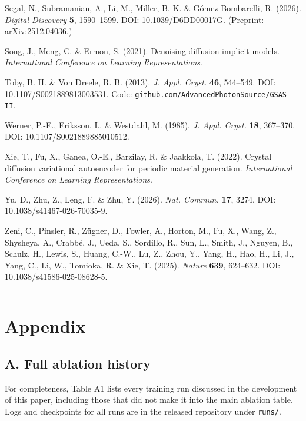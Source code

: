 \documentclass[
  11pt,
]{article}
\begin{document}
Segal, N., Subramanian, A., Li, M., Miller, B. K. \& Gómez-Bombarelli,
R. (2026). \emph{Digital Discovery} \textbf{5}, 1590--1599. DOI:
10.1039/D6DD00017G. (Preprint: arXiv:2512.04036.)

Song, J., Meng, C. \& Ermon, S. (2021). Denoising diffusion implicit
models. \emph{International Conference on Learning Representations}.

Toby, B. H. \& Von Dreele, R. B. (2013). \emph{J. Appl. Cryst.}
\textbf{46}, 544--549. DOI: 10.1107/S0021889813003531. Code:
\texttt{github.com/AdvancedPhotonSource/GSAS-II}.

Werner, P.-E., Eriksson, L. \& Westdahl, M. (1985). \emph{J. Appl.
Cryst.} \textbf{18}, 367--370. DOI: 10.1107/S0021889885010512.

Xie, T., Fu, X., Ganea, O.-E., Barzilay, R. \& Jaakkola, T. (2022).
Crystal diffusion variational autoencoder for periodic material
generation. \emph{International Conference on Learning Representations}.

Yu, D., Zhu, Z., Leng, F. \& Zhu, Y. (2026). \emph{Nat. Commun.}
\textbf{17}, 3274. DOI: 10.1038/s41467-026-70035-9.

Zeni, C., Pinsler, R., Zügner, D., Fowler, A., Horton, M., Fu, X., Wang,
Z., Shysheya, A., Crabbé, J., Ueda, S., Sordillo, R., Sun, L., Smith,
J., Nguyen, B., Schulz, H., Lewis, S., Huang, C.-W., Lu, Z., Zhou, Y.,
Yang, H., Hao, H., Li, J., Yang, C., Li, W., Tomioka, R. \& Xie, T.
(2025). \emph{Nature} \textbf{639}, 624--632. DOI:
10.1038/s41586-025-08628-5.

\begin{center}\rule{0.5\linewidth}{0.5pt}\end{center}

\section{Appendix}\label{appendix}

\subsection{A. Full ablation history}\label{a.-full-ablation-history}

For completeness, Table A1 lists every training run discussed in the
development of this paper, including those that did not make it into the
main ablation table. Logs and checkpoints for all runs are in the
released repository under \texttt{runs/}.
\end{document}
